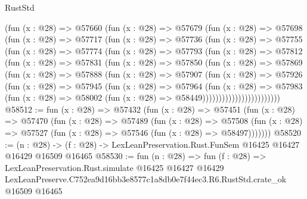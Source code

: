 \begin{lexlean}{RustStd}
\begin{coremodule}
            (fun (x : @28) =>
            @57660
              (fun (x : @28) =>
              @57679
                (fun (x : @28) =>
                @57698
                  (fun (x : @28) =>
                  @57717
                    (fun (x : @28) =>
                    @57736
                      (fun (x : @28) =>
                      @57755
                        (fun (x : @28) =>
                        @57774
                          (fun (x : @28) =>
                          @57793
                            (fun (x : @28) =>
                            @57812
                              (fun (x : @28) =>
                              @57831
                                (fun (x : @28) =>
                                @57850
                                  (fun (x : @28) =>
                                  @57869
                                    (fun (x : @28) =>
                                    @57888
                                      (fun (x : @28) =>
                                      @57907
                                        (fun (x : @28) =>
                                        @57926
                                          (fun (x : @28) =>
                                          @57945
                                            (fun (x : @28) =>
                                            @57964
                                              (fun (x : @28) =>
                                              @57983
                                                (fun (x : @28) =>
                                                @58002
                                                  (fun (x : @28) => @58449))))))))))))))))))))))))
@58512 := fun (x : @28) =>
  @57432
    (fun (x : @28) =>
    @57451
      (fun (x : @28) =>
      @57470
        (fun (x : @28) =>
        @57489
          (fun (x : @28) =>
          @57508 (fun (x : @28) => @57527 (fun (x : @28) => @57546 (fun (x : @28) => @58497)))))))
@58520 := (n : @28) ->
  (f : @28) -> LexLeanPreservation.Rust.FunSem @16425 @16427 @16429 @16509 @16465
@58530 := fun (n : @28) =>
  fun (f : @28) =>
  LexLeanPreservation.Rust.simulate
    @16425
    @16427
    @16429
    LexLeanPreserve.C752ea9d16bb3e8577c1a8db0e7f44ec3.R6.RustStd.crate_ok
    @16509
    @16465
\end{coremodule}
\end{lexlean}

